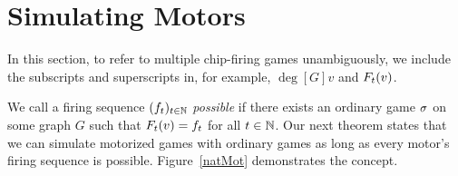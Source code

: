 \section{Simulating Motors} \label{simulatingMotors}
\showgame

In this section, to refer to multiple chip-firing games unambiguously, we
include the subscripts and superscripts in, for example, $\deg[G]{v}$ and
$\firing{v}{t}$.

We call a firing sequence $(f_t)_{t \in \mathbb{N}}$ \emph{possible} if there exists
an ordinary game $\sigma$ on some graph $G$ such that $\firing{v}{t} = f_{t}$ for
all $t \in \mathbb{N}$. Our next theorem states that we can simulate motorized games
with ordinary games as long as every motor's firing sequence is
possible. Figure~\ref{natMot} demonstrates the concept.

